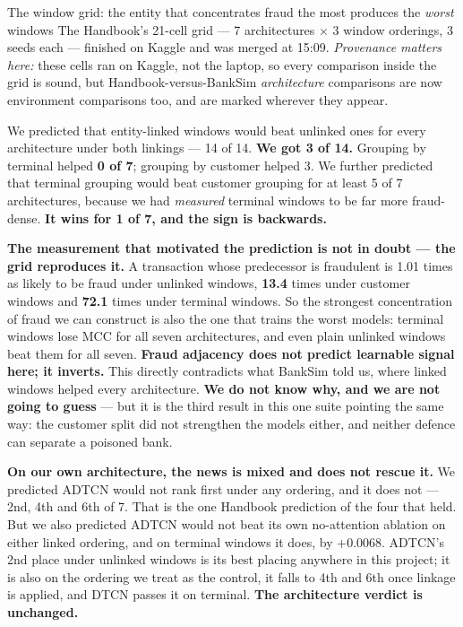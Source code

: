 \documentclass[11pt]{article}
\begin{document}
\begin{warnbox}{The window grid: the entity that concentrates fraud the most produces the \emph{worst} windows}
The Handbook's 21-cell grid --- 7 architectures $\times$ 3 window orderings, 3 seeds each --- finished on
Kaggle and was merged at 15:09. \emph{Provenance matters here:} these cells ran on Kaggle, not the laptop,
so every comparison inside the grid is sound, but Handbook-versus-BankSim \emph{architecture} comparisons
are now environment comparisons too, and are marked wherever they appear.

We predicted that entity-linked windows would beat unlinked ones for every architecture under both
linkings --- 14 of 14. \textbf{We got 3 of 14.} Grouping by terminal helped \textbf{0 of 7}; grouping by
customer helped 3. We further predicted that terminal grouping would beat customer grouping for at least
5 of 7 architectures, because we had \emph{measured} terminal windows to be far more fraud-dense.
\textbf{It wins for 1 of 7, and the sign is backwards.}

\textbf{The measurement that motivated the prediction is not in doubt --- the grid reproduces it.} A
transaction whose predecessor is fraudulent is 1.01 times as likely to be fraud under unlinked windows,
\textbf{13.4} times under customer windows and \textbf{72.1} times under terminal windows. So the
strongest concentration of fraud we can construct is also the one that trains the worst models: terminal
windows lose MCC for all seven architectures, and even plain unlinked windows beat them for all seven.
\textbf{Fraud adjacency does not predict learnable signal here; it inverts.} This directly contradicts
what BankSim told us, where linked windows helped every architecture. \textbf{We do not know why, and we
are not going to guess} --- but it is the third result in this one suite pointing the same way: the
customer split did not strengthen the models either, and neither defence can separate a poisoned bank.

\textbf{On our own architecture, the news is mixed and does not rescue it.} We predicted ADTCN would not
rank first under any ordering, and it does not --- 2nd, 4th and 6th of 7. That is the one Handbook
prediction of the four that held. But we also predicted ADTCN would not beat its own no-attention
ablation on either linked ordering, and on terminal windows it does, by $+0.0068$. ADTCN's 2nd place
under unlinked windows is its best placing anywhere in this project; it is also on the ordering we treat
as the control, it falls to 4th and 6th once linkage is applied, and DTCN passes it on terminal.
\textbf{The architecture verdict is unchanged.}
\end{warnbox}
\end{document}
